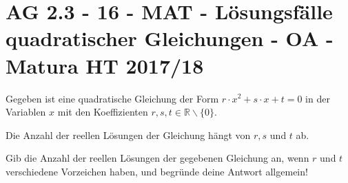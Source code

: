 \section{AG 2.3 - 16 - MAT - Lösungsfälle quadratischer Gleichungen - OA - Matura HT 2017/18}

\begin{beispiel}[AG 2.3]{1} %
Gegeben ist eine quadratische Gleichung der Form $r\cdot x^2+s\cdot x+t=0$ in der Variablen $x$ mit den Koeffizienten $r,s,t\in\mathbb{R}\backslash\{0\}$.

Die Anzahl der reellen Lösungen der Gleichung hängt von $r,s$ und $t$ ab.

Gib die Anzahl der reellen Lösungen der gegebenen Gleichung an, wenn $r$ und $t$ verschiedene Vorzeichen haben, und begründe deine Antwort allgemein!

\end{beispiel}